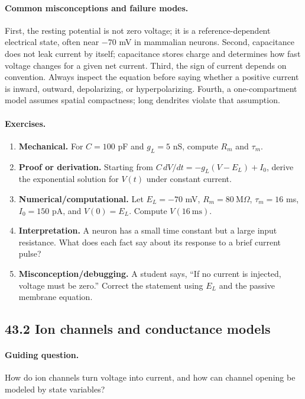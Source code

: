 \paragraph{Common misconceptions and failure modes.}
First, the resting potential is not zero voltage; it is a reference-dependent electrical state, often near \(-70\) mV in mammalian neurons. Second, capacitance does not leak current by itself; capacitance stores charge and determines how fast voltage changes for a given net current. Third, the sign of current depends on convention. Always inspect the equation before saying whether a positive current is inward, outward, depolarizing, or hyperpolarizing. Fourth, a one-compartment model assumes spatial compactness; long dendrites violate that assumption.

\paragraph{Exercises.}
\begin{enumerate}[label=\textbf{43.1.\arabic*.}, leftmargin=*]
\item \textbf{Mechanical.} For \(C=100\) pF and \(g_L=5\) nS, compute \(R_m\) and \(\tau_m\).
\item \textbf{Proof or derivation.} Starting from \(C\,dV/dt=-g_L(V-E_L)+I_0\), derive the exponential solution for \(V(t)\) under constant current.
\item \textbf{Numerical/computational.} Let \(E_L=-70\) mV, \(R_m=80\ \mathrm{M}\Omega\), \(\tau_m=16\) ms, \(I_0=150\) pA, and \(V(0)=E_L\). Compute \(V(16\ \mathrm{ms})\).
\item \textbf{Interpretation.} A neuron has a small time constant but a large input resistance. What does each fact say about its response to a brief current pulse?
\item \textbf{Misconception/debugging.} A student says, ``If no current is injected, voltage must be zero.'' Correct the statement using \(E_L\) and the passive membrane equation.
\end{enumerate}

\subsection{43.2 Ion channels and conductance models}

\paragraph{Guiding question.}
How do ion channels turn voltage into current, and how can channel opening be modeled by state variables?


